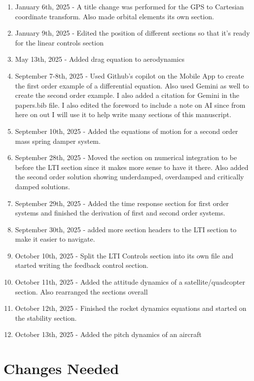 \begin{enumerate}[itemsep=-5pt]
\item January 6th, 2025 - A title change was performed for the GPS to Cartesian coordinate transform. Also made orbital elements its own section.
\item January 9th, 2025 - Edited the position of different sections so that it's ready for the linear controls section
\item May 13th, 2025 - Added drag equation to aerodynamics
\item September 7-8th, 2025 - Used Github's copilot on the Mobile App to create the first order example of a differential equation. Also used Gemini as well to create the second order example. I also added a citation for Gemini in the papers.bib file. I also edited the foreword to include a note on AI since from here on out I will use it to help write many sections of this manuscript.
\item September 10th, 2025 - Added the equations of motion for a second order mass spring damper system.
\item September 28th, 2025 - Moved the section on numerical integration to be before the LTI section since it makes more sense to have it there. Also added the second order solution showing underdamped, overdamped and critically damped solutions.
\item September 29th, 2025 - Added the time response section for first order systems and finished the derivation of first and second order systems.
\item September 30th, 2025 - added more section headers to the LTI section to make it easier to navigate.
\item October 10th, 2025 - Split the LTI Controls section into its own file and started writing the feedback control section.
\item October 11th, 2025 - Added the attitude dynamics of a satellite/quadcopter section. Also rearranged the sections overall
\item October 12th, 2025 - Finished the rocket dynamics equations and started on the stability section.
\item October 13th, 2025 - Added the pitch dynamics of an aircraft
\end{enumerate}

\section*{Changes Needed}

